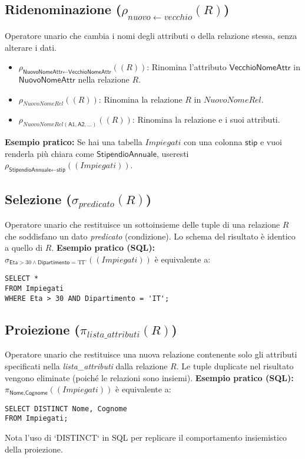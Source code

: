 \documentclass{article}
\newcommand{\Rel}[1]{\textit{#1}} %
\newcommand{\Attr}[1]{\textsf{#1}} %
\newcommand{\myrename}[2]{\rho_{#1}(#2)}
\newcommand{\myselectop}[2]{\sigma_{#1}(#2)}
\newcommand{\myproject}[2]{\pi_{#1}(#2)}
\newcommand{\mylandop}{\wedge}
\begin{document}
	\subsection{Ridenominazione ($\myrename{nuovo \leftarrow vecchio}{R}$)}
	Operatore unario che cambia i nomi degli attributi o della relazione stessa, senza alterare i dati.
	\begin{itemize}
		\item $\myrename{\Attr{NuovoNomeAttr} \leftarrow \Attr{VecchioNomeAttr}}{(\Rel{R})}$: Rinomina l'attributo $\Attr{VecchioNomeAttr}$ in $\Attr{NuovoNomeAttr}$ nella relazione $\Rel{R}$.
		\item $\myrename{\Rel{NuovoNomeRel}}{(\Rel{R})}$: Rinomina la relazione $\Rel{R}$ in $\Rel{NuovoNomeRel}$.
		\item $\myrename{\Rel{NuovoNomeRel}(\Attr{A1}, \Attr{A2}, \dots)}{(\Rel{R})}$: Rinomina la relazione e i suoi attributi.
	\end{itemize}
	\textbf{Esempio pratico:} Se hai una tabella $\Rel{Impiegati}$ con una colonna $\Attr{stip}$ e vuoi renderla più chiara come $\Attr{StipendioAnnuale}$, useresti $\myrename{\Attr{StipendioAnnuale} \leftarrow \Attr{stip}}{(\Rel{Impiegati})}$.
	
	\subsection{Selezione ($\myselectop{predicato}{R}$)}
	Operatore unario che restituisce un sottoinsieme delle tuple di una relazione $\Rel{R}$ che soddisfano un dato \textit{predicato} (condizione).
	Lo schema del risultato è identico a quello di $\Rel{R}$.
	\textbf{Esempio pratico (SQL):}
	$\myselectop{\Attr{Eta} > 30 \mylandop \Attr{Dipartimento} = \text{'IT'}}{(\Rel{Impiegati})}$
	è equivalente a:
	\begin{verbatim}
SELECT *
FROM Impiegati
WHERE Eta > 30 AND Dipartimento = 'IT';
	\end{verbatim}
	
	\subsection{Proiezione ($\myproject{lista\_attributi}{R}$)}
	Operatore unario che restituisce una nuova relazione contenente solo gli attributi specificati nella \textit{lista\_attributi} dalla relazione $\Rel{R}$.
	Le tuple duplicate nel risultato vengono eliminate (poiché le relazioni sono insiemi).
	\textbf{Esempio pratico (SQL):}
	$\myproject{\Attr{Nome}, \Attr{Cognome}}{(\Rel{Impiegati})}$
	è equivalente a:
	\begin{verbatim}
SELECT DISTINCT Nome, Cognome
FROM Impiegati;
	\end{verbatim}
	Nota l'uso di `DISTINCT` in SQL per replicare il comportamento insiemistico della proiezione.
	
\end{document}
